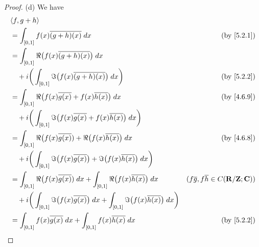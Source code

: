 \begin{proof}{(d)}
  We have
  \begin{align*}
     & \inner*{f, g + h}                                                                                                                                                                          \\
     & = \int_{[0, 1]} f(x) \overline{(g + h)(x)} \; dx                                                                                    & \text{(by \cref{5.2.1})}                             \\
     & = \int_{[0, 1]} \Re\big(f(x) \overline{(g + h)(x)}\big) \; dx                                                                                                                              \\
     & \quad + i \bigg(\int_{[0, 1]} \Im\big(f(x) \overline{(g + h)(x)}\big) \; dx\bigg)                                                   & \text{(by \cref{5.2.2})}                             \\
     & = \int_{[0, 1]} \Re\big(f(x) \overline{g(x)} + f(x) \overline{h(x)}\big) \; dx                                                      & \text{(by \cref{4.6.9})}                             \\
     & \quad + i \bigg(\int_{[0, 1]} \Im\big(f(x) \overline{g(x)} + f(x) \overline{h(x)}\big) \; dx\bigg)                                                                                         \\
     & = \int_{[0, 1]} \Re\big(f(x) \overline{g(x)}) + \Re\big(f(x) \overline{h(x)}\big) \; dx                                             & \text{(by \cref{4.6.8})}                             \\
     & \quad + i \bigg(\int_{[0, 1]} \Im\big(f(x) \overline{g(x)}\big) + \Im\big(f(x) \overline{h(x)}\big) \; dx\bigg)                                                                            \\
     & = \int_{[0, 1]} \Re\big(f(x) \overline{g(x)}) \; dx + \int_{[0, 1]} \Re\big(f(x) \overline{h(x)}\big) \; dx                         & (f \overline{g}, f \overline{h} \in C(\R / \Z ; \C)) \\
     & \quad + i \bigg(\int_{[0, 1]} \Im\big(f(x) \overline{g(x)}\big) \; dx + \int_{[0, 1]} \Im\big(f(x) \overline{h(x)}\big) \; dx\bigg)                                                        \\
     & = \int_{[0, 1]} f(x) \overline{g(x)} \; dx + \int_{[0, 1]} f(x) \overline{h(x)} \; dx                                               & \text{(by \cref{5.2.2})}                             \\

\end{align*}
\end{proof}
